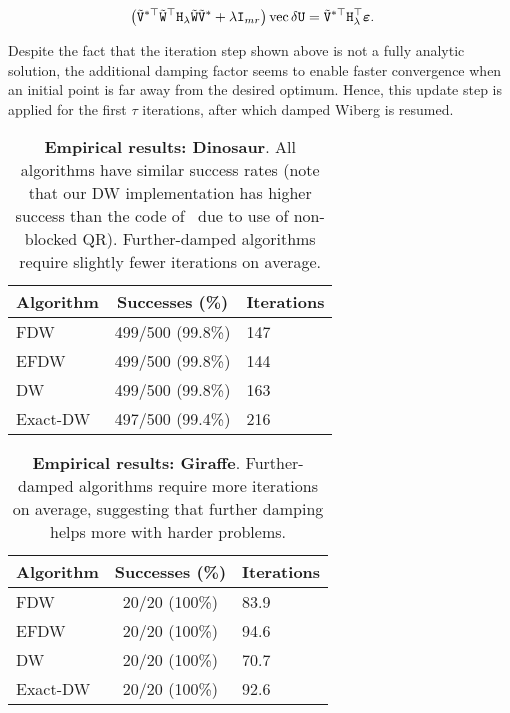 \documentclass[runningheads]{llncs}
\def\tr{^\top}
\def\vec{\operatorname{vec}}
\def\m#1{\ensuremath{\mathtt{#1}}}
\def\mW{\m W}
\def\twiddle#1{{\tilde{#1}}}
\def\tW{\twiddle\mW}
\begin{document}
\begin{align}
\left( \tilde{\m V}^{*\top} \tW \tr \m H_\lambda \tW \tilde{\m V}^* + \lambda \m I_{mr} \right)
\vec {\delta \m U} &= \tilde{\m V}^{*\top} \m H_\lambda \tr \verru.
\end{align}

Despite the fact that the iteration step shown above is not a fully analytic solution, the additional damping factor seems to enable faster convergence when an initial point is far away from the desired optimum. Hence, this update step is applied for the first $\tau$ iterations, after which damped Wiberg is resumed.

\def\spc{\hspace*{1em}}
\begin{table}[b]
\begin{center}
\begin{tabular}{l|c|@{\spc}l}
Algorithm \spc&\spc Successes (\%)\spc & Iterations\\\hline
FDW &  499/500 (99.8\%) & 147\\
EFDW & 499/500 (99.8\%) & 144\\
DW &  499/500 (99.8\%) & 163\\
Exact-DW & 497/500 (99.4\%) & 216
\end{tabular}
\end{center}
\caption{{\bf Empirical results: Dinosaur}.   All algorithms have similar success rates (note that our DW implementation has higher success than the code of~\cite{okatani2011efficient} due to use of non-blocked QR).  Further-damped algorithms require slightly fewer iterations on average.}
\label{tbl:results-dino}
\end{table}

\begin{table}[b]
\begin{center}
\begin{tabular}{l|c|@{\spc}l}
Algorithm \spc&\spc Successes (\%)\spc & Iterations\\\hline
FDW &  20/20 (100\%) & 83.9\\
EFDW & 20/20 (100\%) & 94.6\\
DW &  20/20 (100\%) & 70.7\\
Exact-DW & 20/20 (100\%) & 92.6
\end{tabular}
\end{center}
\caption{{\bf Empirical results: Giraffe}.   Further-damped algorithms require more iterations on average, suggesting that further damping helps more with harder problems.}
\label{tbl:results-giraffe}
\end{table}
\end{document}
